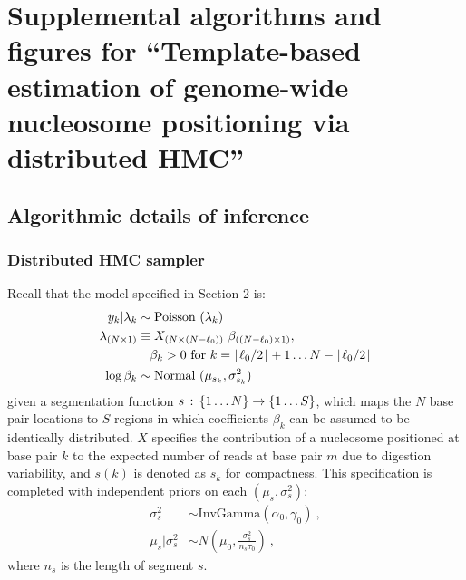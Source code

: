 
\chapter{Supplemental algorithms and figures for ``Template-based estimation of genome-wide nucleosome positioning via distributed HMC''}

\section{Algorithmic details of inference}

\subsection{Distributed HMC sampler}
\label{supp:nucleosomes:sec:mcmc}

Recall that the model specified in Section 2 is:
\begin{align}
 \label{supp:nucleosomes:eq:observation_model}
  y_k|\lambda_k         & \sim \hbox{Poisson } (\lambda_k) \\
 \label{supp:nucleosomes:eq:linear_model}
  \lambda_{(N\times 1)} & \equiv X_{(N\times (N - \ell_0))} ~ \beta_{((N - \ell_0)\times 1)}, \\
\nonumber & \quad \beta_k>0 \hbox{ for } k=\lfloor \ell_0 / 2 \rfloor + 1 \dots N - \lfloor \ell_0 / 2 \rfloor \\
\label{supp:nucleosomes:eq:positioning_model}
  \log \beta_k        & \sim \hbox{Normal } (\mu_{s_k},\sigma^2_{s_k})
\end{align}
given a segmentation function $s \,:\, \left\{1 \ldots N\right\} \rightarrow \left\{1 \ldots S\right\}$, which maps the $N$ base pair locations to $S$ regions in which coefficients $\beta_k$ can be assumed to be identically distributed.
$X$ specifies the contribution of a nucleosome positioned at base pair $k$ to the expected number of reads at base pair $m$ due to digestion variability, and $s(k)$ is denoted as $s_k$ for compactness.
This specification is completed with independent priors on each $(\mu_s, \sigma^2_s)$:
\begin{align}
\sigma^2_{s} &\sim \mathrm{InvGamma}(\alpha_0, \gamma_0) \ , \\
\mu_{s} | \sigma^2_{s} &\sim N(\mu_0, \frac{\sigma^2_{s}}{n_{s} \tau_0}) \ ,
\end{align}
where $n_{s}$ is the length of segment $s$.

